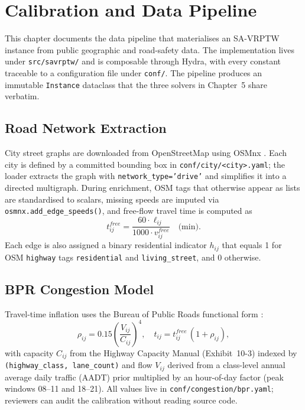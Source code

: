 \chapter{Calibration and Data Pipeline}
\label{ch4}

This chapter documents the data pipeline that materialises an
SA-VRPTW instance from public geographic and road-safety data. The
implementation lives under \texttt{src/savrptw/} and is composable
through Hydra, with every constant traceable to a configuration file
under \texttt{conf/}. The pipeline produces an immutable
\texttt{Instance} dataclass that the three solvers in Chapter~5 share
verbatim.

\section{Road Network Extraction}

City street graphs are downloaded from OpenStreetMap using OSMnx
\citep{boeing2017osmnx}. Each city is defined by a committed bounding
box in \texttt{conf/city/<city>.yaml}; the loader extracts the graph
with \texttt{network\_type='drive'} and simplifies it into a directed
multigraph. During enrichment, OSM tags that otherwise appear as
lists are standardised to scalars, missing speeds are imputed via
\texttt{osmnx.add\_edge\_speeds()}, and free-flow travel time is
computed as
\begin{equation}
    t_{ij}^{free} = \frac{60 \cdot \ell_{ij}}{1000 \cdot v_{ij}^{free}}
    \quad \text{(min)}.
\end{equation}
Each edge is also assigned a binary residential indicator $h_{ij}$
that equals 1 for OSM \texttt{highway} tags
\texttt{residential} and \texttt{living\_street}, and 0 otherwise.

\section{BPR Congestion Model}

Travel-time inflation uses the Bureau of Public Roads functional form
\citep{bpr1964}:
\begin{equation}
    \rho_{ij} = 0.15 \left(\frac{V_{ij}}{C_{ij}}\right)^4,
    \quad
    t_{ij} = t_{ij}^{free}\,(1 + \rho_{ij}),
    \label{eq:BPR}
\end{equation}
with capacity $C_{ij}$ from the Highway Capacity Manual
\citep{hcm2010} (Exhibit~10-3) indexed by
\texttt{(highway\_class, lane\_count)} and flow $V_{ij}$ derived from
a class-level annual average daily traffic (AADT) prior multiplied by
an hour-of-day factor (peak windows 08--11 and 18--21). All values
live in \texttt{conf/congestion/bpr.yaml}; reviewers can audit the
calibration without reading source code.

